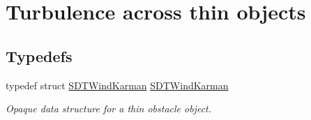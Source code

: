 \hypertarget{group__windkarman}{}\section{Turbulence across thin objects}
\label{group__windkarman}
\subsection*{Typedefs}
\begin{DoxyCompactItemize}
\item 
\hypertarget{group__windkarman_ga80be8ba31406840ae33d6a97e0cad1b1}{}typedef struct \hyperlink{group__windkarman_ga80be8ba31406840ae33d6a97e0cad1b1}{S\+D\+T\+Wind\+Karman} \hyperlink{group__windkarman_ga80be8ba31406840ae33d6a97e0cad1b1}{S\+D\+T\+Wind\+Karman}\label{group__windkarman_ga80be8ba31406840ae33d6a97e0cad1b1}

\begin{DoxyCompactList}\small\item\em Opaque data structure for a thin obstacle object. \end{DoxyCompactList}\end{DoxyCompactItemize}

